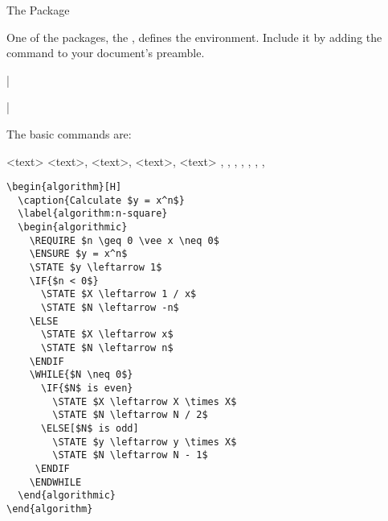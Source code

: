 \begin{frame}[fragile]{The  Package}

One of the packages, the , defines the  environment. Include it by adding the command to your document's preamble. 
\begin{command}
\LC|\usepackage{algorithmic}|
\end{command}
The basic commands are:
\begin{command}
\begin{LCL}
\STATE <text>
  \ELSE {} \ENDIF
{}    \ENDIF
{}  \ENDFOR
{}  \ENDFOR
{}  \ENDFOR
{}  \ENDWHILE
\REPEAT {} 
\LOOP {} \ENDLOOP
\REQUIRE <text>, \ENSURE <text>, \RETURN <text>, \PRINT <text>
\AND, \OR, \XOR, \NOT, \TO, \TRUE, \FALSE, 
\end{LCL}
\end{command}

\end{frame}
%
\begin{frame}[fragile]

\begin{example}
\begin{verbatim}
\begin{algorithm}[H]
  \caption{Calculate $y = x^n$}
  \label{algorithm:n-square}
  \begin{algorithmic}
    \REQUIRE $n \geq 0 \vee x \neq 0$
    \ENSURE $y = x^n$
    \STATE $y \leftarrow 1$
    \IF{$n < 0$}
      \STATE $X \leftarrow 1 / x$
      \STATE $N \leftarrow -n$
    \ELSE
      \STATE $X \leftarrow x$
      \STATE $N \leftarrow n$
    \ENDIF
    \WHILE{$N \neq 0$}
      \IF{$N$ is even}
        \STATE $X \leftarrow X \times X$
        \STATE $N \leftarrow N / 2$
      \ELSE[$N$ is odd]
        \STATE $y \leftarrow y \times X$
        \STATE $N \leftarrow N - 1$
     \ENDIF
    \ENDWHILE
  \end{algorithmic}
\end{algorithm}
\end{verbatim}
\end{example}

\end{frame}

